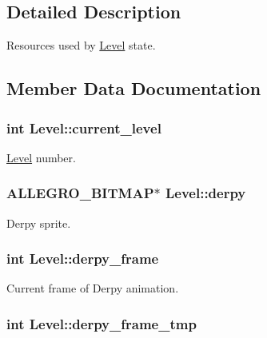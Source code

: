 \subsection{\-Detailed \-Description}
\-Resources used by \hyperlink{structLevel}{\-Level} state. 

\subsection{\-Member \-Data \-Documentation}
\hypertarget{structLevel_a1ba3ee0104c912dde5d6e70fee889512}{
\subsubsection[{current\-\_\-level}]{\setlength{\rightskip}{0pt plus 5cm}int {\bf \-Level\-::current\-\_\-level}}}\label{structLevel_a1ba3ee0104c912dde5d6e70fee889512}
\hyperlink{structLevel}{\-Level} number. \hypertarget{structLevel_ae33832497116b7a0c184959bbde21ee5}{
\subsubsection[{derpy}]{\setlength{\rightskip}{0pt plus 5cm}\-A\-L\-L\-E\-G\-R\-O\-\_\-\-B\-I\-T\-M\-A\-P$\ast$ {\bf \-Level\-::derpy}}}\label{structLevel_ae33832497116b7a0c184959bbde21ee5}
\-Derpy sprite. \hypertarget{structLevel_aab3e7d9746c741ce8e1a76df13be7c53}{
\subsubsection[{derpy\-\_\-frame}]{\setlength{\rightskip}{0pt plus 5cm}int {\bf \-Level\-::derpy\-\_\-frame}}}\label{structLevel_aab3e7d9746c741ce8e1a76df13be7c53}
\-Current frame of \-Derpy animation. \hypertarget{structLevel_aa6a30e7b31e2300936f8e97890e1817c}{
\subsubsection[{derpy\-\_\-frame\-\_\-tmp}]{\setlength{\rightskip}{0pt plus 5cm}int {\bf \-Level\-::derpy\-\_\-frame\-\_\-tmp}}}\label{structLevel_aa6a30e7b31e2300936f8e97890e1817c}

